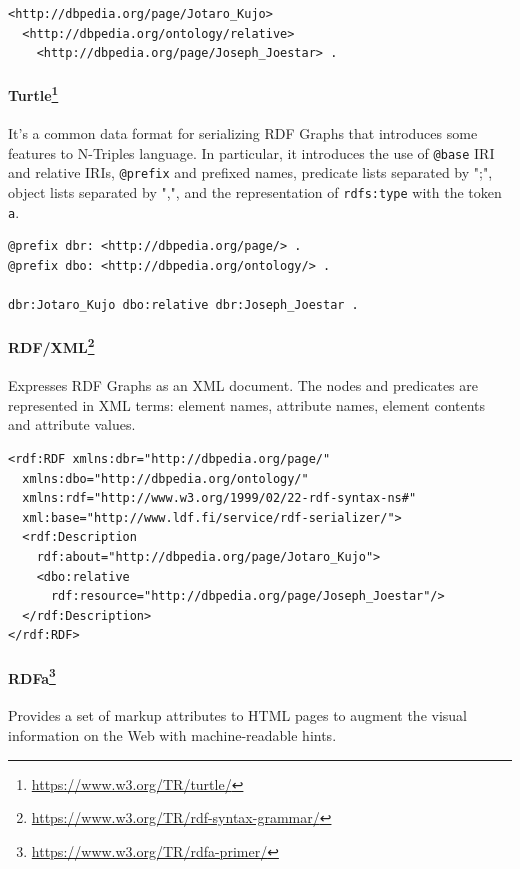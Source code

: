 \begin{verbatim}
<http://dbpedia.org/page/Jotaro_Kujo>
  <http://dbpedia.org/ontology/relative>
    <http://dbpedia.org/page/Joseph_Joestar> .
\end{verbatim}

\paragraph*{Turtle\footnote{\url{https://www.w3.org/TR/turtle/}}} It's a common data format for serializing \ac{RDF} Graphs that introduces some features to N-Triples language. In particular, it introduces the use of \texttt{@base} \ac{IRI} and relative \acp{IRI}, \texttt{@prefix} and prefixed names, predicate lists separated by ";", object lists separated by ",", and the representation of \texttt{rdfs:type} with the token \texttt{a}.

\begin{verbatim}
@prefix dbr: <http://dbpedia.org/page/> .
@prefix dbo: <http://dbpedia.org/ontology/> .

dbr:Jotaro_Kujo dbo:relative dbr:Joseph_Joestar .
\end{verbatim}

\paragraph*{RDF/XML\footnote{\url{https://www.w3.org/TR/rdf-syntax-grammar/}}} Expresses \ac{RDF} Graphs as an \acs{XML} document. The nodes and predicates are represented in \acs{XML} terms: element names, attribute names, element contents and attribute values.

\begin{verbatim}
<rdf:RDF xmlns:dbr="http://dbpedia.org/page/"
  xmlns:dbo="http://dbpedia.org/ontology/"
  xmlns:rdf="http://www.w3.org/1999/02/22-rdf-syntax-ns#"
  xml:base="http://www.ldf.fi/service/rdf-serializer/">
  <rdf:Description
    rdf:about="http://dbpedia.org/page/Jotaro_Kujo">
    <dbo:relative
      rdf:resource="http://dbpedia.org/page/Joseph_Joestar"/>
  </rdf:Description>
</rdf:RDF>    
\end{verbatim}

\paragraph*{\ac{RDFa}\footnote{\url{https://www.w3.org/TR/rdfa-primer/}}} Provides a set of markup attributes to \acs{HTML} pages to augment the visual information on the Web with machine-readable hints.

